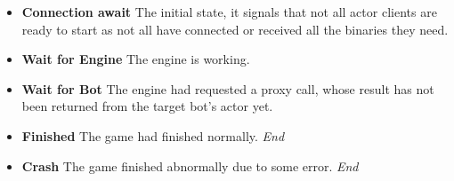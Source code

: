 		\begin{itemize}
			\item \textbf{Connection await} The initial state, it signals that not all actor clients are ready to start as not all have connected or received all the binaries they need.
			
			\item \textbf{Wait for Engine} The engine is working.

			\item \textbf{Wait for Bot} The engine had requested a proxy call, whose result has not been returned from the target bot's actor yet.
			
			\item \textbf{Finished} The game had finished normally. \emph{End}
			
			\item \textbf{Crash} The game finished abnormally due to some error. \emph{End}
		\end{itemize}

